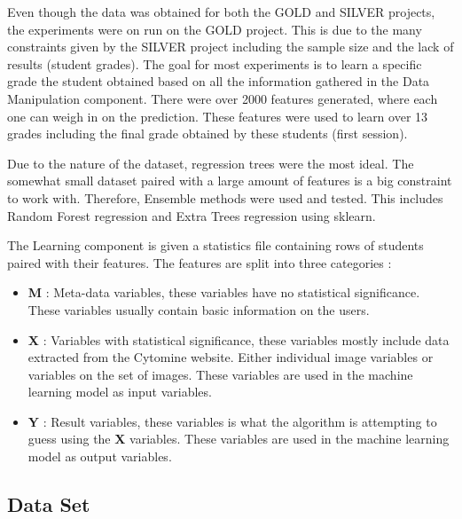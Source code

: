 \documentclass[a4paper,11pt]{report}
\numberwithin{figure}{section} %
\begin{document}
    
    Even though the data was obtained for both the GOLD and SILVER projects, the experiments were on run on the GOLD project.
    This is due to the many constraints given by the SILVER project including the sample size and the lack of results (student grades).
    The goal for most experiments is to learn a specific grade the student obtained based on all the information gathered in the Data Manipulation component.
    There were over 2000 features generated, where each one can weigh in on the prediction.
    These features were used to learn over 13 grades including the final grade obtained by these students (first session).\newline
    
    
    Due to the nature of the dataset, regression trees were the most ideal.
    The somewhat small dataset paired with a large amount of features is a big constraint to work with.
    Therefore, Ensemble methods were used and tested.
    This includes Random Forest regression and Extra Trees regression using sklearn.\newline
    
    The Learning component is given a statistics file containing rows of students paired with their features.
    The features are split into three categories :
    \begin{itemize}
\item[\textbullet] \textbf{M} : Meta-data variables, these variables have no statistical significance.
These variables usually contain basic information on the users.\\
\item[\textbullet] \textbf{X} : Variables with statistical significance, these variables mostly include data extracted from the Cytomine website.
Either individual image variables or variables on the set of images.
These variables are used in the machine learning model as input variables.\\
\item[\textbullet] \textbf{Y} : Result variables, these variables is what the algorithm is attempting to guess using the  \textbf{X} variables.
These variables are used in the machine learning model as output variables.\\
\end{itemize}
    
    
    
    \subsection{Data Set} \label{Data_Set}
    
\end{document}
